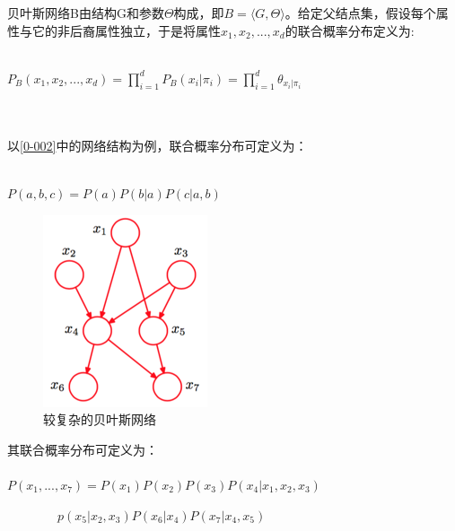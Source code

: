 \begin{frame}
	贝叶斯网络B由结构G和参数$\Theta$构成，即$B=\langle G, \Theta\rangle$。给定父结点集，假设每个属性与它的非后裔属性独立，于是将属性$x_1, x_2, ..., x_d$的联合概率分布定义为:
	~\\
	~\\
	\centerline{{\large $P_B(x_1,x_2,...,x_d)=\prod_{i=1}^{d}P_B(x_i|\pi_i)=\prod_{i=1}^{d}\theta_{x_i|\pi_i}$}}
	~\\
	~\\
	以\ref{0-002}中的网络结构为例，联合概率分布可定义为：
	~\\
	~\\
	\centerline{{\large $P(a,b,c)=P(a)P(b|a)P(c|a,b)$}}
\end{frame}

\begin{frame}
\begin{figure}
	\centering
	\includegraphics[scale=0.7]{topic/BayesianNetwork/bayesian.png}
	\caption{较复杂的贝叶斯网络}
	\label{0-003}
\end{figure}
\end{frame}

\begin{frame}
	其联合概率分布可定义为：
	~\\
	~\\
	$P(x_1,...,x_7)=P(x_1)P(x_2)P(x_3)P(x_4|x_1,x_2,x_3)$
	\centerline{$\qquad\qquad p(x_5|x_2,x_3)P(x_6|x_4)P(x_7|x_4,x_5)$}
\end{frame}
	
